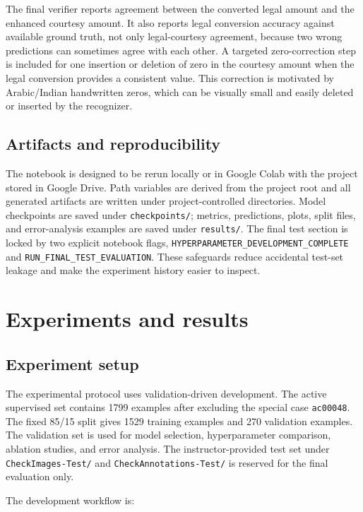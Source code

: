 \documentclass{article}
\begin{document}
The final verifier reports agreement between the converted legal amount and the enhanced courtesy amount. It also reports legal conversion accuracy against available ground truth, not only legal-courtesy agreement, because two wrong predictions can sometimes agree with each other. A targeted zero-correction step is included for one insertion or deletion of zero in the courtesy amount when the legal conversion provides a consistent value. This correction is motivated by Arabic/Indian handwritten zeros, which can be visually small and easily deleted or inserted by the recognizer.

\subsection{Artifacts and reproducibility}

The notebook is designed to be rerun locally or in Google Colab with the project stored in Google Drive. Path variables are derived from the project root and all generated artifacts are written under project-controlled directories. Model checkpoints are saved under \texttt{checkpoints/}; metrics, predictions, plots, split files, and error-analysis examples are saved under \texttt{results/}. The final test section is locked by two explicit notebook flags, \texttt{HYPERPARAMETER\_DEVELOPMENT\_COMPLETE} and \texttt{RUN\_FINAL\_TEST\_EVALUATION}. These safeguards reduce accidental test-set leakage and make the experiment history easier to inspect.

\section{Experiments and results}

\subsection{Experiment setup}

The experimental protocol uses validation-driven development. The active supervised set contains 1799 examples after excluding the special case \texttt{ac00048}. The fixed 85/15 split gives 1529 training examples and 270 validation examples. The validation set is used for model selection, hyperparameter comparison, ablation studies, and error analysis. The instructor-provided test set under \texttt{CheckImages-Test/} and \texttt{CheckAnnotations-Test/} is reserved for the final evaluation only.

The development workflow is:
\end{document}
